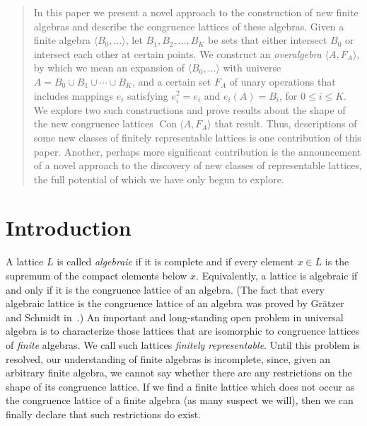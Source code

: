 \documentclass{au}
\numberwithin{equation}{section}
\theoremstyle{plain}
\theoremstyle{definition}
\newcommand{\<}{\ensuremath{\langle}}
\renewcommand{\>}{\ensuremath{\rangle}}
\DeclareMathOperator{\Con}{Con}
\renewcommand{\leq}{\ensuremath{\leqslant}}
\begin{document}
\begin{abstract}
In this paper we present a novel approach to the construction of new finite
algebras and describe the congruence lattices of these algebras. Given a finite
algebra $\<B_0, \dots\>$, let $B_1, B_2, \dots, B_K$ be sets that either intersect
$B_0$ or intersect each other at certain points.
We construct an  {\it overalgebra} $\<A, F_A\>$, by which we mean an expansion
of $\<B_0, \dots\>$ with universe  $A = B_0 \cup B_1 \cup \cdots \cup B_K$,  and
a certain set $F_A$ of unary operations that includes mappings $e_i$ satisfying
$e_i^2 = e_i$ and $e_i(A) = B_i$, for $0\leq i \leq K$.
We explore two such constructions and prove results about the shape of
the new congruence lattices $\Con \<A, F_A\>$ that result. Thus, descriptions of
some new classes of finitely representable lattices is one contribution of this
paper. Another, perhaps more significant contribution is the announcement of a
novel approach to the discovery of new classes of representable lattices, the
full potential of which we have only begun to explore.
\end{abstract}

\maketitle

\section{Introduction}
A lattice $L$ is called \emph{algebraic} if it is complete and if every element
$x \in L$ is the supremum of the compact elements below $x$.
Equivalently, a lattice is algebraic if and only if it is the congruence lattice
of an algebra.  (The fact that every algebraic lattice is the congruence lattice of an
algebra was proved by Gr\"{a}tzer and Schmidt
in~\cite{GratzerSchmidt:1963}.)  An important and long-standing open problem in
universal algebra is to characterize those lattices that are isomorphic to congruence
lattices of \emph{finite} algebras.  We call such lattices \emph{finitely representable}.
Until this problem is resolved, our understanding of finite algebras is
incomplete, since, given an arbitrary finite algebra, we cannot say
whether there are any restrictions on the shape of its congruence lattice.
If we find a finite lattice which does not occur as the congruence lattice of a
finite algebra (as many suspect we will), then we can finally declare that such
restrictions do exist.
\end{document}
